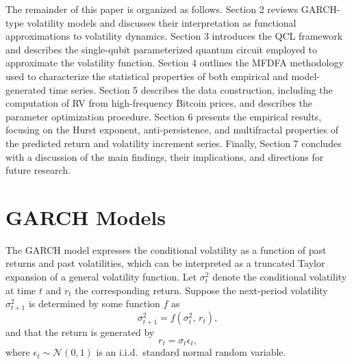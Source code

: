 \documentclass[preprints,article,accept,pdftex,oneauthor]{Definitions/mdpi}
\begin{document}
The remainder of this paper is organized as follows. Section 2 reviews GARCH-type volatility models and discusses their interpretation as functional approximations to volatility dynamics. Section 3 introduces the QCL framework and describes the single-qubit parameterized quantum circuit employed to approximate the volatility function. Section 4 outlines the MFDFA methodology used to characterize the statistical properties of both empirical and model-generated time series. Section 5 describes the data construction, including the computation of RV from high-frequency Bitcoin prices, and describes the parameter optimization procedure. Section 6 presents the empirical results, focusing on the Hurst exponent, anti-persistence, and multifractal properties of the predicted return and volatility increment series. Finally, Section 7 concludes with a discussion of the main findings, their implications, and directions for future research.

\section{GARCH Models}
 
The GARCH model expresses the conditional volatility as a function of
past returns and past volatilities, which can be interpreted as a
truncated Taylor expansion of a general volatility function. Let
$\sigma_t^2$ denote the conditional volatility at time $t$ and $r_t$ the
corresponding return. Suppose the next-period volatility $\sigma_{t+1}^2$
is determined by some function $f$ as
\begin{equation}
  \sigma_{t+1}^2 = f\!\left(\sigma_t^2,\, r_t\right), \label{eq:vol_general}
\end{equation}
and that the return is generated by
\begin{equation}
  r_t = \sigma_t \epsilon_t,
\end{equation}
where $\epsilon_t \sim \mathcal{N}(0,1)$ is an i.i.d.\ standard normal
random variable.
 
\end{document}

